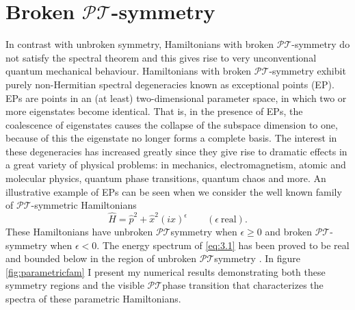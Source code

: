 \documentclass[12pt, a4paper]{report}
\newcommand\PT{\(\mathcal{PT}\)}
\begin{document}
\chapter{Broken \PT-symmetry}\label{EPs}
In contrast with unbroken symmetry, Hamiltonians with broken \PT-symmetry do not satisfy the spectral theorem and this gives rise to very unconventional quantum mechanical behaviour. Hamiltonians with broken \PT-symmetry exhibit purely non-Hermitian spectral degeneracies known as exceptional points (EP)\cite{Bossart}.
EPs are points in an (at least) two-dimensional parameter space, in which two or more eigenstates become identical\cite{Moiseyev}\cite{Cartarius}. That is, in the presence of EPs, the coalescence of eigenstates causes the collapse of the subspace dimension to one, because of this the eigenstate no longer forms a complete basis\cite{Bagarello}. The interest in these degeneracies has increased greatly since they give rise to dramatic effects in a great variety of physical problems: in mechanics, electromagnetism, atomic and molecular physics, quantum phase transitions, quantum chaos and more\cite{Heiss_2012}.
An illustrative example of EPs can be seen when we consider the well known family of \PT-symmetric Hamiltonians
\begin{equation}\label{eq:3.1}
\hat{H} = \hat{p}^2 + \hat{x}^{2}(i x)^{\epsilon} \quad\quad (\epsilon\:\mathrm{real}). 
\end{equation}
These Hamiltonians have unbroken \PT\:symmetry when $\epsilon \geq 0$ and broken \PT-symmetry when $\epsilon < 0$\cite{MakingSense}. The energy spectrum of \ref{eq:3.1} has been proved to be real and bounded below in the region of unbroken \PT\:symmetry \cite{Dorey_2004}. In figure \ref{fig:parametricfam} I present my numerical results demonstrating both these symmetry regions and the visible \PT\:phase transition that characterizes the spectra of these parametric Hamiltonians.
\end{document}
